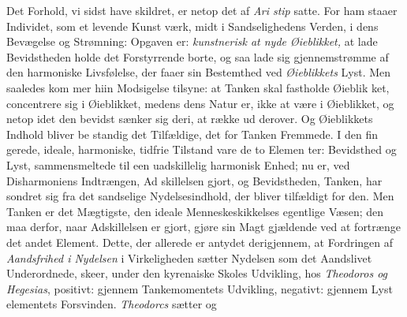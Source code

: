 Det Forhold, vi sidst have skildret, er netop det af \emph{Ari\-%
stip} satte. For ham staaer Individet, som et levende Kunst\-%
værk, midt i Sandselighedens Verden, i dens Bevægelse og
Strømning: Opgaven er: \emph{kunstnerisk at nyde Øieblikket,}
at lade Bevidstheden holde det Forstyrrende borte, og saa lade
sig gjennemstrømme af den harmoniske Livsfølelse, der faaer
sin Bestemthed ved \emph{Øieblikkets} Lyst. Men saaledes kom\-%
mer hiin Modsigelse tilsyne: at Tanken skal fastholde Øieblik\-%
ket, concentrere sig i Øieblikket, medens dens Natur er, ikke
at være i Øieblikket, og netop idet den bevidst sænker sig
deri, at række ud derover. Og Øieblikkets Indhold bliver be\-%
standig det Tilfældige, det for Tanken Fremmede. I den fin\-%
gerede, ideale, harmoniske, tidfrie Tilstand vare de to Elemen\-%
ter: Bevidsthed og Lyst, sammensmeltede til een uadskillelig
harmonisk Enhed; nu er, ved Disharmoniens Indtrængen, Ad\-%
skillelsen gjort, og Bevidstheden, Tanken, har sondret sig fra
det sandselige Nydelsesindhold, der bliver tilfældigt for den.
Men Tanken er det Mægtigste, den ideale Menneskeskikkelses
egentlige Væsen; den maa derfor, naar Adskillelsen er gjort,
gjøre sin Magt gjældende ved at fortrænge det andet Element.
Dette, der allerede er antydet derigjennem, at Fordringen af
\emph{Aandsfrihed i Nydelsen} i Virkeligheden sætter Nydelsen
som det Aandslivet Underordnede, skeer, under den kyrenaiske
Skoles Udvikling, hos \emph{Theodoros og Hegesias}, positivt:
gjennem Tankemomentets Udvikling, negativt: gjennem Lyst\-%
\setcounter{footnote}{0}%
elementets Forsvinden. \emph{Theodorcs} sætter  og 
